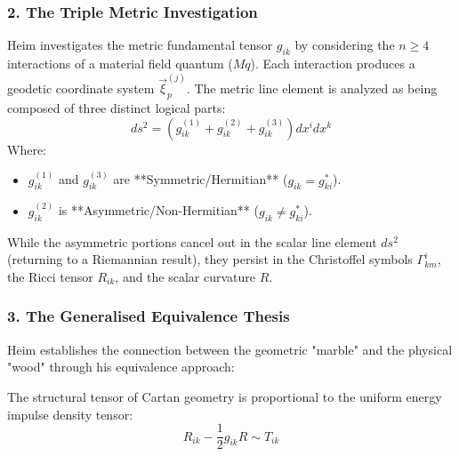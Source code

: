\documentclass[11pt,a4paper,oneside]{article}
\begin{document}
\subsubsection*{2. The Triple Metric Investigation}
Heim investigates the metric fundamental tensor $g_{ik}$ by considering the $n \ge 4$ interactions of a material field quantum ($Mq$). Each interaction produces a geodetic coordinate system $\vec{\xi}_p^{(j)}$. The metric line element is analyzed as being composed of three distinct logical parts:
\begin{equation}
    ds^2 = (g_{ik}^{(1)} + g_{ik}^{(2)} + g_{ik}^{(3)}) dx^i dx^k
\tag{I-3.2}
\end{equation}
Where:
\begin{itemize}
    \item $g_{ik}^{(1)}$ and $g_{ik}^{(3)}$ are **Symmetric/Hermitian** ($g_{ik} = g_{ki}^*$).
    \item $g_{ik}^{(2)}$ is **Asymmetric/Non-Hermitian** ($g_{ik} \neq g_{ki}^*$).
\end{itemize}
While the asymmetric portions cancel out in the scalar line element $ds^2$ (returning to a Riemannian result), they persist in the Christoffel symbols $\Gamma_{km}^i$, the Ricci tensor $R_{ik}$, and the scalar curvature $R$.

\subsubsection*{3. The Generalised Equivalence Thesis}
Heim establishes the connection between the geometric "marble" and the physical "wood" through his equivalence approach:
\begin{tcolorbox}[colback=white, colframe=theoryblue, title=\textbf{Heim's Unified Field Equation}]
The structural tensor of Cartan geometry is proportional to the uniform energy impulse density tensor:
\begin{equation}
    R_{ik} - \frac{1}{2} g_{ik} R \sim T_{ik}
\end{equation}
\end{tcolorbox}
\end{document}
